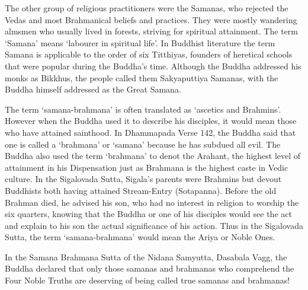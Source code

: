 The other group of religious practitioners were the Samanas, who rejected the Vedas and most Brahmanical beliefs and practices. They were mostly wandering almsmen who usually lived in forests, striving for spiritual attainment. The term ‘Samana’ means ‘labourer in spiritual life’. In Buddhist literature the term Samana is applicable to the order of six Titthiyas, founders of heretical schools that were popular during the Buddha’s time. Although the Buddha addressed his monks as Bikkhus, the people called them Sakyaputtiya Samanas, with the Buddha himself addressed as the Great Samana.

The term ‘samana-brahmana’ is often translated as ‘ascetics and Brahmins’. However when the Buddha used it to describe his disciples, it would mean those who have attained sainthood. In Dhammapada Verse 142, the Buddha said that one is called a ‘brahmana’ or ‘samana’ because he has subdued all evil. The Buddha also used the term ‘brahmana’ to denot the Arahant, the highest level of attainment in his Dispensation just as Brahmana is the highest caste in Vedic culture. In the Sigalovada Sutta, Sigala’s parents were Brahmins but devout Buddhists both having attained Stream-Entry (Sotapanna). Before the old Brahman died, he advised his son, who had no interest in religion to worship the six quarters, knowing that the Buddha or one of his disciples would see the act and explain to his son the actual significance of his action. Thus in the Sigalovada Sutta, the term ‘samana-brahmana’ would mean the Ariya or Noble Ones.

In the Samana Brahmana Sutta of the Nidana Samyutta, Dasabala Vagg, the Buddha declared that only those samanas and brahmanas who comprehend the Four Noble Truths are deserving of being called true samanas and brahmanas!
